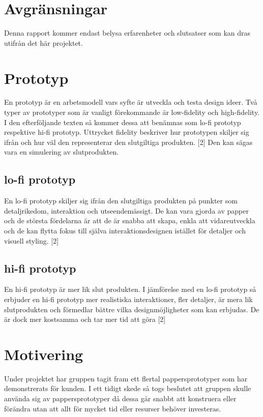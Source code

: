 \section{Avgränsningar}
Denna rapport kommer endast belysa erfarenheter och slutsatser som kan dras utifrån det här projektet.

\section{Prototyp} 
En prototyp är en arbetsmodell vars syfte är utveckla och testa design ideer. Två typer av prototyper som är vanligt förekommande är low-fidelity och high-fidelity. I den efterföljande texten så  kommer dessa att benämnas som lo-fi prototyp respektive hi-fi prototyp. Uttrycket fidelity beskriver hur prototypen skiljer sig ifrån och hur väl den representerar den slutgiltiga produkten. [2]  Den kan sägas vara en simulering av slutprodukten.    

\subsection{lo-fi prototyp} 
En lo-fi prototyp skiljer sig ifrån den slutgiltiga produkten på punkter som detaljrikedom, interaktion och utseendemässigt. De kan vara gjorda av papper och de största fördelarna är att de är snabba att skapa, enkla att vidareutveckla  och de kan flytta fokus till själva interaktionsdesignen istället för detaljer och visuell styling. [2]

\subsection{hi-fi prototyp}
En hi-fi prototyp är mer lik slut produkten.  I jämförelse med en lo-fi prototyp så erbjuder en hi-fi prototyp mer realistiska interaktioner, fler detaljer, är mera lik slutprodukten och förmedlar bättre vilka designmöjligheter som kan erbjudas. De är dock mer kostsamma och tar mer tid att göra  [2] 

\section{Motivering}  
Under projektet har gruppen tagit fram ett flertal pappersprototyper som har demonstrerats för kunden. I ett tidigt skede så togs beslutet att gruppen skulle använda sig av pappersprototyper då dessa går snabbt att konstruera  eller förändra utan att allt för mycket tid eller resurser behöver investeras.   
  


